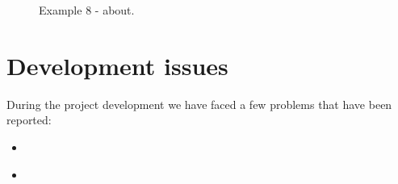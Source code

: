 \documentclass[11pt,a4paper]{article}
\begin{document}
\begin{figure}[H]
    \centering
    \caption{Example 8 - about.}
    \label{fig:example8}
\end{figure}

\section{Development issues}

During the project development we have faced a few problems that have been reported:
\begin{itemize}
    \item \href{https://github.com/IBM-Bluemix-Docs/ContinuousDelivery/issues/13}{}
    \item \href{https://github.com/IBM-Cloud/aspnet-core-helloworld/issues/39}{\color{urlColor}{github.com/IBM-Cloud/aspnet-core-helloworld/issues/39}}
\end{itemize}
\end{document}
